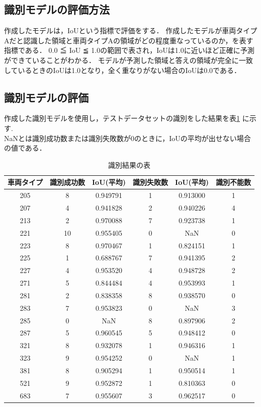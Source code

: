 \subsection{識別モデルの評価方法}
作成したモデルは，IoUという指標で評価をする．
作成したモデルが車両タイプAだと認識した領域と車両タイプAの領域がどの程度重なっているのか，を表す指標である．
0.0 ≦ IoU ≦ 1.0の範囲で表され，IoUは1.0に近いほど正確に予測ができていることがわかる．
モデルが予測した領域と答えの領域が完全に一致しているときのIoUは1.0となり，全く重なりがない場合のIoUは0.0である．

\subsection{識別モデルの評価}
作成した識別モデルを使用し，テストデータセットの識別をした結果を表\ref{tab:identification_results} に示す.\\
NaNとは識別成功数または識別失敗数が0のときに，IoUの平均が出せない場合の値である．
\begin{table}[htbp] 
	\centering
	\begin{tabular}{cccccc}
		\hline
		車両タイプ & 識別成功数 & IoU(平均) & 識別失敗数 & IoU(平均) & 識別不能数 \\
		\hline \hline
		\hline
		205 & 8 & 0.949791 & 1 & 0.913000 & 1 \\
		207 & 4 & 0.941828 & 2 & 0.940226 & 4 \\
		213 & 2 & 0.970088 & 7 & 0.923738 & 1 \\
		221 & 10 & 0.955405 & 0 & NaN & 0 \\
		223 & 8 & 0.970467 & 1 & 0.824151 & 1 \\
		225 & 1 & 0.688767 & 7 & 0.941395 & 2 \\
		227 & 4 & 0.953520 & 4 & 0.948728 & 2 \\
		271 & 5 & 0.844484 & 4 & 0.953993 & 1 \\
		281 & 2 & 0.838358 & 8 & 0.938570 & 0 \\
		283 & 7 & 0.953823 & 0 & NaN & 3 \\
		285 & 0 & NaN & 8 & 0.897906 & 2 \\
		287 & 5 & 0.960545 & 5 & 0.948412 & 0 \\
		321 & 8 & 0.932078 & 1 & 0.946316 & 1 \\
		323 & 9 & 0.954252 & 0 & NaN & 1 \\
		381 & 8 & 0.905294 & 1 & 0.950514 & 1 \\
		521 & 9 & 0.952872 & 1 & 0.810363 & 0 \\
		683 & 7 & 0.955607 & 3 & 0.962517 & 0 \\
		\hline
	\end{tabular}
	\caption{識別結果の表}
	\label{tab:identification_results}
\end{table}


